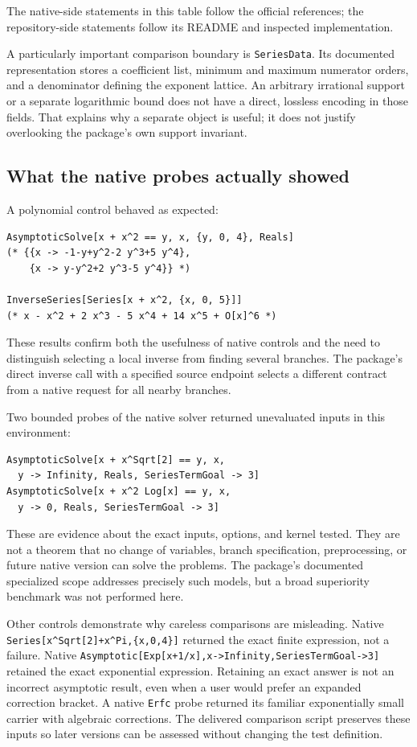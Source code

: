 \documentclass[11pt,letterpaper]{article}
\newcommand{\code}[1]{{\small\nolinkurl{#1}}}
\begin{document}
The native-side statements in this table follow the official references; the repository-side statements follow its README and inspected implementation.\cite{wl-series,wl-inverseseries,wl-seriesdata,wl-solve,wl-asymptotic,readme,certificates}

A particularly important comparison boundary is \code{SeriesData}. Its documented representation stores a coefficient list, minimum and maximum numerator orders, and a denominator defining the exponent lattice. An arbitrary irrational support or a separate logarithmic bound does not have a direct, lossless encoding in those fields. That explains why a separate object is useful; it does not justify overlooking the package's own support invariant.\cite{wl-seriesdata}

\subsection{What the native probes actually showed}
A polynomial control behaved as expected:
\begin{lstlisting}
AsymptoticSolve[x + x^2 == y, x, {y, 0, 4}, Reals]
(* {{x -> -1-y+y^2-2 y^3+5 y^4},
    {x -> y-y^2+2 y^3-5 y^4}} *)

InverseSeries[Series[x + x^2, {x, 0, 5}]]
(* x - x^2 + 2 x^3 - 5 x^4 + 14 x^5 + O[x]^6 *)
\end{lstlisting}
These results confirm both the usefulness of native controls and the need to distinguish selecting a local inverse from finding several branches. The package's direct inverse call with a specified source endpoint selects a different contract from a native request for all nearby branches.

Two bounded probes of the native solver returned unevaluated inputs in this environment:
\begin{lstlisting}
AsymptoticSolve[x + x^Sqrt[2] == y, x,
  y -> Infinity, Reals, SeriesTermGoal -> 3]
AsymptoticSolve[x + x^2 Log[x] == y, x,
  y -> 0, Reals, SeriesTermGoal -> 3]
\end{lstlisting}
These are evidence about the exact inputs, options, and kernel tested. They are not a theorem that no change of variables, branch specification, preprocessing, or future native version can solve the problems. The package's documented specialized scope addresses precisely such models, but a broad superiority benchmark was not performed here.\cite{readme,wl-solve}

Other controls demonstrate why careless comparisons are misleading. Native \code{Series[x^Sqrt[2]+x^Pi,{x,0,4}]} returned the exact finite expression, not a failure. Native \code{Asymptotic[Exp[x+1/x],x->Infinity,SeriesTermGoal->3]} retained the exact exponential expression. Retaining an exact answer is not an incorrect asymptotic result, even when a user would prefer an expanded correction bracket. A native \code{Erfc} probe returned its familiar exponentially small carrier with algebraic corrections. The delivered comparison script preserves these inputs so later versions can be assessed without changing the test definition.
\end{document}
